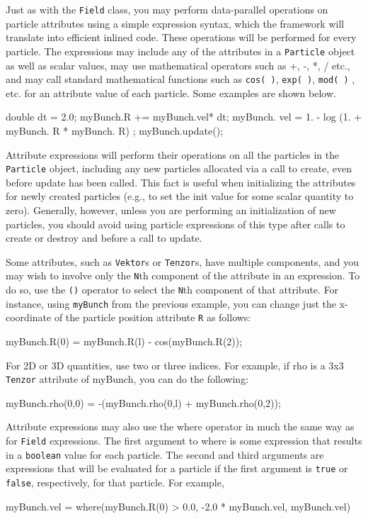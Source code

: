 Just as with the \texttt{Field} class, you may perform data-parallel operations on particle attributes using a simple expression syntax, which the \ippl framework will translate into efficient inlined code. These operations will be performed for every particle. The expressions may include any of the attributes in a \texttt{Particle} object as well as scalar values, may use mathematical operators such as +, -, *, / etc., and may call standard mathematical functions such as \texttt{cos(
)}, \texttt{exp( )}, \texttt{mod( )} , etc. for an attribute value of each particle. Some examples are shown below.
\begin{smallcode}
double dt = 2.0; 
myBunch.R += myBunch.vel* dt; 
myBunch. vel = 1. - log (1. + myBunch. R * myBunch. R) ; 
myBunch.update(); 
\end{smallcode}


Attribute expressions will perform their operations on all the particles in the \texttt{Particle} object, including any new particles allocated via a call to create, even before update has been called. This fact is useful when initializing the attributes for newly created particles (e.g., to set the init value for some scalar quantity to zero). Generally, however, unless you are performing an initialization of new particles, you should avoid using particle expressions of this type after calls to create or destroy and before a call to update.

Some attributes, such as \texttt{Vektor}s or \texttt{Tenzor}s, have multiple components, and you may wish to involve only the \texttt{N}th component of the attribute in an expression. To do so, use the \texttt{()} operator to select the \texttt{N}th component of that attribute. For instance, using \texttt{myBunch} from the previous example, you can change just the x-coordinate of the particle position attribute \texttt{R} as follows: 
\begin{smallcode}
myBunch.R(0) = myBunch.R(l) - cos(myBunch.R(2));
\end{smallcode}


For 2D or 3D quantities, use two or three indices. For example, if rho is a 3x3 \texttt{Tenzor} attribute of myBunch, you can do the following:
\begin{smallcode}
myBunch.rho(0,0) = -(myBunch.rho(0,l) + myBunch.rho(0,2)); 
\end{smallcode}

Attribute expressions may also use the where operator in much the same way as for \texttt{Field} expressions. The first argument to where is some expression that results in a \texttt{boolean} value for each particle. The second and third arguments are expressions that will be evaluated for a particle if the first argument is \texttt{true} or \texttt{false}, respectively, for that particle. For example,
\begin{smallcode}
myBunch.vel = where(myBunch.R(0) > 0.0, -2.0 * myBunch.vel, myBunch.vel) 
\end{smallcode}

